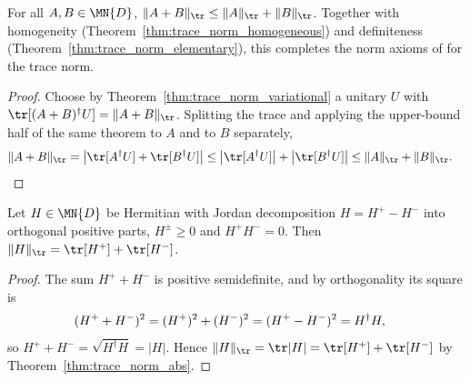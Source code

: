 \begin{theorem}
    \label{thm:trace_norm_triangle}
    \leanok
    For all $A,B\in\MN{D}$,
    $\lVert A+B\rVert_{\tr}
        \leq\lVert A\rVert_{\tr}+\lVert B\rVert_{\tr}$.
    Together with homogeneity (Theorem~\ref{thm:trace_norm_homogeneous}) and
    definiteness (Theorem~\ref{thm:trace_norm_elementary}), this completes
    the norm axioms of \cite[Chapter~8, Section~8.1]{Wolf2012Quantum} for the
    trace norm.
\end{theorem}

\begin{proof}\leanok
    Choose by Theorem~\ref{thm:trace_norm_variational} a unitary $U$ with
    $\tr[(A+B)^\dagger U]=\lVert A+B\rVert_{\tr}$.
    Splitting the trace and applying the upper-bound half of the same
    theorem to $A$ and to $B$ separately,
    \begin{align}
        \lVert A+B\rVert_{\tr}
         & =\bigl|\tr[A^\dagger U]
        +\tr[B^\dagger U]\bigr|
        \leq\bigl|\tr[A^\dagger U]\bigr|
        +\bigl|\tr[B^\dagger U]\bigr|
        \leq\lVert A\rVert_{\tr}+\lVert B\rVert_{\tr}.
        \notag
    \end{align}
\end{proof}

\begin{lemma}
    \label{lem:trace_norm_jordan}
    \leanok
    Let $H\in\MN{D}$ be Hermitian with Jordan decomposition $H=H^+-H^-$
    into orthogonal positive parts, $H^\pm\geq0$ and $H^+H^-=0$. Then
    $\lVert H\rVert_{\tr}=\tr[H^+]+\tr[H^-]$.
\end{lemma}

\begin{proof}\leanok
    The sum $H^++H^-$ is positive semidefinite, and by orthogonality its
    square is
    \begin{align}
        (H^++H^-)^2
         & =(H^+)^2+(H^-)^2
        =(H^+-H^-)^2
        =H^\dagger H,
        \notag
    \end{align}
    so $H^++H^-=\sqrt{H^\dagger H}=\lvert H\rvert$. Hence
    $\lVert H\rVert_{\tr}
        =\tr\lvert H\rvert
        =\tr[H^+]+\tr[H^-]$
    by Theorem~\ref{thm:trace_norm_abs}.
\end{proof}


